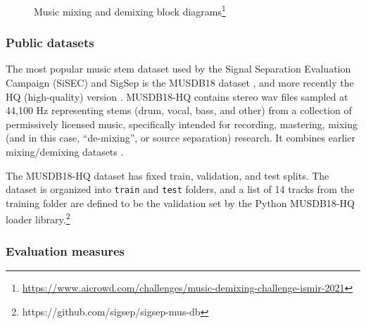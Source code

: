 \documentclass[report.tex]{subfiles}
\begin{document}
\begin{figure}[ht]
	\centering
        \begin{minipage}{1.\textwidth}
		\renewcommand\footnoterule{} %
		\renewcommand{\thempfootnote}{\fnsymbol{mpfootnote}}
		\centering
		\caption[Music mixing and demixing block diagrams]{Music mixing and demixing block diagrams\footnote{\url{https://www.aicrowd.com/challenges/music-demixing-challenge-ismir-2021}}}
		\label{fig:mixingdiagrams}
	\end{minipage}
\end{figure}

\subsubsection{Public datasets}
\label{sec:musicsepdatasets}

The most popular music stem dataset used by the Signal Separation Evaluation Campaign (SiSEC) and SigSep is the MUSDB18 dataset \parencite{musdb18}, and more recently the HQ (high-quality) version \parencite{musdb18hq}. MUSDB18-HQ contains stereo wav files sampled at 44,100 Hz representing stems (drum, vocal, bass, and other) from a collection of permissively licensed music, specifically intended for recording, mastering, mixing (and in this case, ``de-mixing'', or source separation) research. It combines earlier mixing/demixing datasets \parencite{sisec2016, otherdataset2}.

The MUSDB18-HQ dataset has fixed train, validation, and test splits. The dataset is organized into \Verb#train# and \Verb#test# folders, and a list of 14 tracks from the training folder are defined to be the validation set by the Python MUSDB18-HQ loader library.\footnote{https://github.com/sigsep/sigsep-mus-db}


\subsubsection{Evaluation measures}
\label{sec:evalbss}
\end{document}
